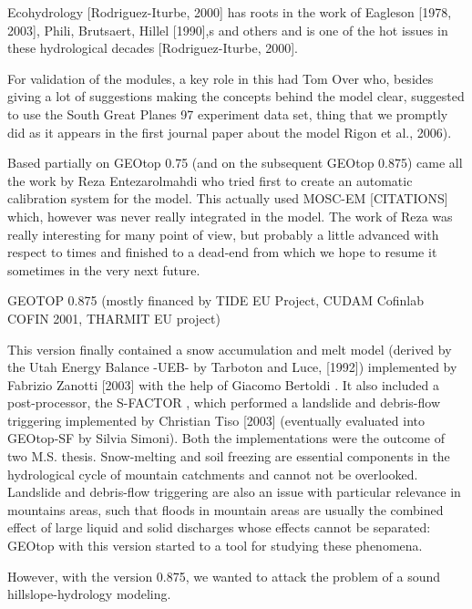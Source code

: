 Ecohydrology [Rodriguez-Iturbe, 2000] has roots in the work of Eagleson [1978, 2003], Phili, Brutsaert, Hillel [1990],s and others and is one of the hot issues in these hydrological decades [Rodriguez-Iturbe, 2000]. 

For validation of the modules, a key role in this had Tom Over who, besides giving a lot of suggestions making the concepts behind the model clear, suggested to use the South Great Planes 97 experiment data set, thing that we promptly did as it appears in the first journal paper about the model Rigon et al., 2006). 

Based partially on GEOtop 0.75 (and on the subsequent GEOtop 0.875) came all the work by Reza Entezarolmahdi who tried first to create an automatic calibration system for the model. This actually used MOSC-EM [CITATIONS] which, however was never really integrated in the model.  The work of Reza was really interesting for many point of view, but probably a little advanced with respect to times and finished to a dead-end from which we hope to resume it sometimes in the very next future. 

GEOTOP 0.875
(mostly financed by TIDE EU Project, CUDAM Cofinlab COFIN 2001, THARMIT EU project)

This version finally contained a snow accumulation and melt model (derived by the Utah Energy Balance -UEB- by Tarboton and Luce, [1992]) implemented by Fabrizio Zanotti [2003] with the help of Giacomo Bertoldi .  It also included a post-processor, the S-FACTOR , which performed a landslide and debris-flow triggering implemented by Christian Tiso [2003] (eventually evaluated into GEOtop-SF by Silvia Simoni).  Both the implementations were the outcome of two M.S. thesis.  Snow-melting and soil freezing are essential components in the hydrological cycle of mountain catchments and cannot not be overlooked. Landslide and debris-flow triggering are also an issue with particular relevance in mountains areas, such that floods in mountain areas are usually the combined effect of large liquid and solid discharges whose effects cannot be separated: GEOtop with this version started to a tool for studying these phenomena. 

However, with the version 0.875, we wanted to attack the problem of a sound hillslope-hydrology modeling. 

